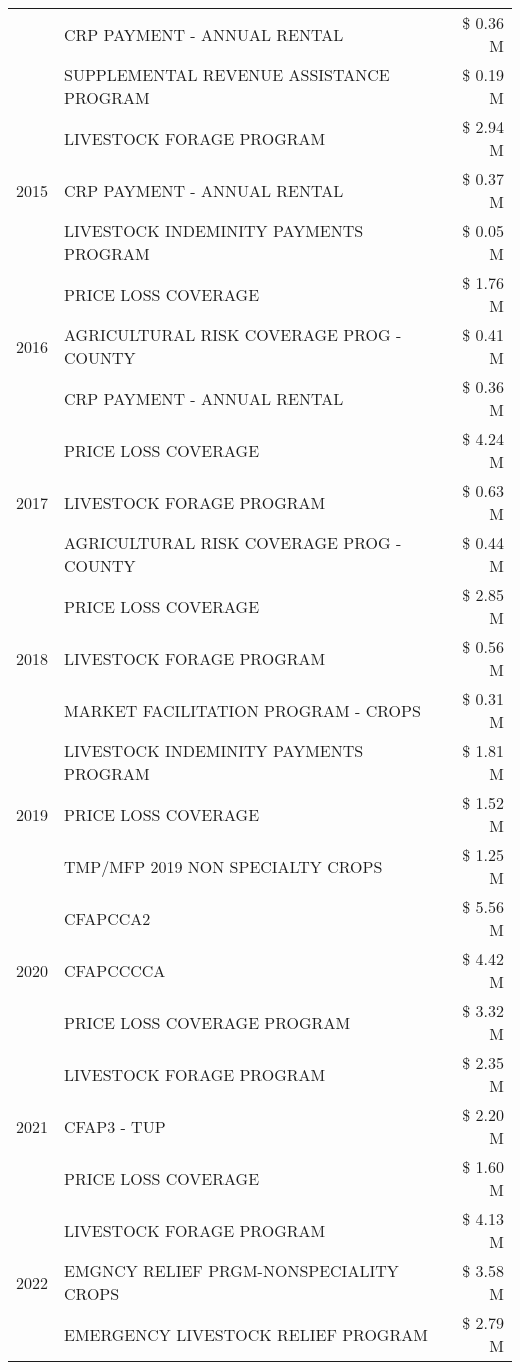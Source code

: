 \begin{tabular}{llr}
 & CRP PAYMENT - ANNUAL RENTAL & \$ 0.36 M \\
 & SUPPLEMENTAL REVENUE ASSISTANCE PROGRAM & \$ 0.19 M \\
\cline{1-3}
\multirow[t]{3}{*}{2015} & LIVESTOCK FORAGE PROGRAM & \$ 2.94 M \\
 & CRP PAYMENT - ANNUAL RENTAL & \$ 0.37 M \\
 & LIVESTOCK INDEMINITY PAYMENTS PROGRAM & \$ 0.05 M \\
\cline{1-3}
\multirow[t]{3}{*}{2016} & PRICE LOSS COVERAGE & \$ 1.76 M \\
 & AGRICULTURAL RISK COVERAGE PROG - COUNTY & \$ 0.41 M \\
 & CRP PAYMENT - ANNUAL RENTAL & \$ 0.36 M \\
\cline{1-3}
\multirow[t]{3}{*}{2017} & PRICE LOSS COVERAGE & \$ 4.24 M \\
 & LIVESTOCK FORAGE PROGRAM & \$ 0.63 M \\
 & AGRICULTURAL RISK COVERAGE PROG - COUNTY & \$ 0.44 M \\
\cline{1-3}
\multirow[t]{3}{*}{2018} & PRICE LOSS COVERAGE & \$ 2.85 M \\
 & LIVESTOCK FORAGE PROGRAM & \$ 0.56 M \\
 & MARKET FACILITATION PROGRAM - CROPS & \$ 0.31 M \\
\cline{1-3}
\multirow[t]{3}{*}{2019} & LIVESTOCK INDEMINITY PAYMENTS PROGRAM & \$ 1.81 M \\
 & PRICE LOSS COVERAGE & \$ 1.52 M \\
 & TMP/MFP 2019 NON SPECIALTY CROPS & \$ 1.25 M \\
\cline{1-3}
\multirow[t]{3}{*}{2020} & CFAPCCA2 & \$ 5.56 M \\
 & CFAPCCCCA & \$ 4.42 M \\
 & PRICE LOSS COVERAGE PROGRAM & \$ 3.32 M \\
\cline{1-3}
\multirow[t]{3}{*}{2021} & LIVESTOCK FORAGE PROGRAM & \$ 2.35 M \\
 & CFAP3 - TUP & \$ 2.20 M \\
 & PRICE LOSS COVERAGE & \$ 1.60 M \\
\cline{1-3}
\multirow[t]{3}{*}{2022} & LIVESTOCK FORAGE PROGRAM & \$ 4.13 M \\
 & EMGNCY RELIEF PRGM-NONSPECIALITY CROPS & \$ 3.58 M \\
 & EMERGENCY LIVESTOCK RELIEF PROGRAM & \$ 2.79 M \\
\cline{1-3}
\bottomrule
\end{tabular}
